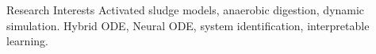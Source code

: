 \begin{rubric}{Research Interests}
\entry*[Modelling] Activated sludge models, anaerobic digestion, dynamic simulation.
\entry*[Methods] Hybrid ODE, Neural ODE, system identification, interpretable learning.
\end{rubric}
